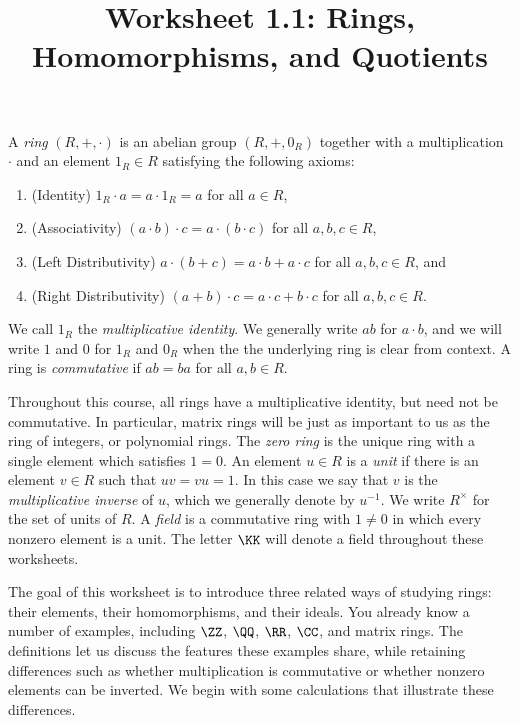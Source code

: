 \documentclass[12pt,reqno]{amsart}
\title{Worksheet 1.1: Rings, Homomorphisms, and Quotients}
\begin{document}
\maketitle
\thispagestyle{firstpage}

A \emph{ring} $(R,+,\cdot)$ is an abelian group $(R,+,0_R)$ together with a multiplication $\cdot$ and an element $1_R\in R$ satisfying the following axioms:
\begin{enumerate}[label=(\roman*)]
\item (Identity) $1_R\cdot a=a \cdot 1_R=a$ for all $a\in R$,
\item (Associativity) $(a\cdot b)\cdot c=a\cdot(b\cdot c)$ for all $a,b,c\in R$,
\item (Left Distributivity) $a\cdot(b+c)=a\cdot b+a \cdot c$ for all $a,b,c\in R$, and
\item (Right Distributivity) $(a+b)\cdot c=a\cdot c+b \cdot c$ for all $a,b,c\in R$.
\end{enumerate}
We call $1_{R}$ the \emph{multiplicative identity}. We generally write $ab$ for $a\cdot b$, and we will write $1$ and $0$ for $1_R$ and $0_R$ when the the underlying ring is clear from context. A ring is \emph{commutative} if $ab=ba$ for all $a,b\in R$.

Throughout this course, all rings have a multiplicative identity, but need not be commutative. In particular, matrix rings will be just as important to us as the ring of integers, or polynomial rings. The \emph{zero ring} is the unique ring with a single element which satisfies $1=0$.  An element $u\in R$ is a \emph{unit} if there is an element $v\in R$ such that $uv=vu=1$. In this case we say that $v$ is the \emph{multiplicative inverse} of $u$, which we generally denote by  $u^{-1}$. We write $R^\times$ for the set of units of $R$. A \emph{field} is a commutative ring with $1\ne0$ in which every nonzero element is a unit. The letter $\KK$ will denote a field throughout these worksheets.

The goal of this worksheet is to introduce three related ways of studying rings: their elements, their homomorphisms, and their ideals. You already know a number of examples, including $\ZZ$, $\QQ$, $\RR$, $\CC$, and matrix rings. The definitions let us discuss the features these examples share, while retaining differences such as whether multiplication is commutative or whether nonzero elements can be inverted. We begin with some calculations that illustrate these differences.

\hrulefill
\end{document}
